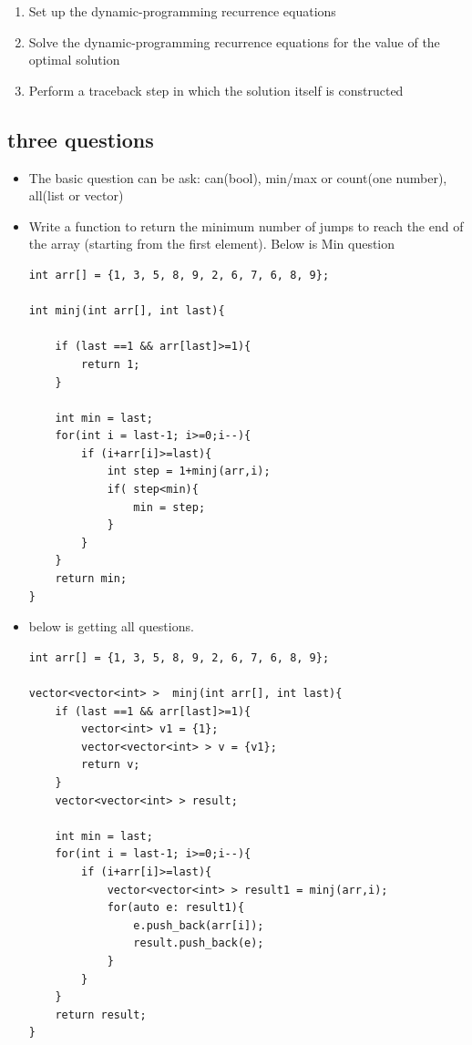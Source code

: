\documentclass[a4paper,11pt,twoside]{book}
\begin{document}
\begin{itemize}
\begin{enumerate}
\item Set up the dynamic-programming recurrence equations
\item Solve the dynamic-programming recurrence equations for the value of the optimal solution
\item Perform a traceback step in which the solution itself is constructed
\end{enumerate}

\end{itemize}


\subsection{three questions}

\begin{itemize}
	
	\item The basic question can be ask: can(bool), min/max or count(one number), all(list or vector)
	

	\item  Write a function to return the minimum number of jumps to reach the end of the array (starting from the first element). Below is Min question
	
\begin{lstlisting}[numbers=none]
int arr[] = {1, 3, 5, 8, 9, 2, 6, 7, 6, 8, 9};

int minj(int arr[], int last){
	
	if (last ==1 && arr[last]>=1){
		return 1;
	}
	
	int min = last;
	for(int i = last-1; i>=0;i--){
		if (i+arr[i]>=last){
			int step = 1+minj(arr,i);
			if( step<min){
				min = step;
			}
		}    
	}
	return min;
}	
\end{lstlisting} 	
	
	
	\item below is getting all questions.  
\begin{lstlisting}[numbers=none]
int arr[] = {1, 3, 5, 8, 9, 2, 6, 7, 6, 8, 9};

vector<vector<int> >  minj(int arr[], int last){	
	if (last ==1 && arr[last]>=1){
		vector<int> v1 = {1};
		vector<vector<int> > v = {v1};
		return v;
	}	
	vector<vector<int> > result;
	
	int min = last;
	for(int i = last-1; i>=0;i--){
		if (i+arr[i]>=last){
			vector<vector<int> > result1 = minj(arr,i);
			for(auto e: result1){
				e.push_back(arr[i]);
				result.push_back(e);
			}
		}
	}
	return result;
}				
\end{lstlisting} 
	

\end{itemize}
\end{document}
